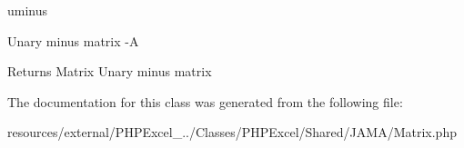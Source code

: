 uminus

Unary minus matrix -\/A \begin{DoxyReturn}{Returns}
Matrix Unary minus matrix 
\end{DoxyReturn}


The documentation for this class was generated from the following file\+:\begin{DoxyCompactItemize}
\item 
resources/external/\+P\+H\+P\+Excel\+\_../\+Classes/\+P\+H\+P\+Excel/\+Shared/\+J\+A\+M\+A/Matrix.\+php\end{DoxyCompactItemize}
